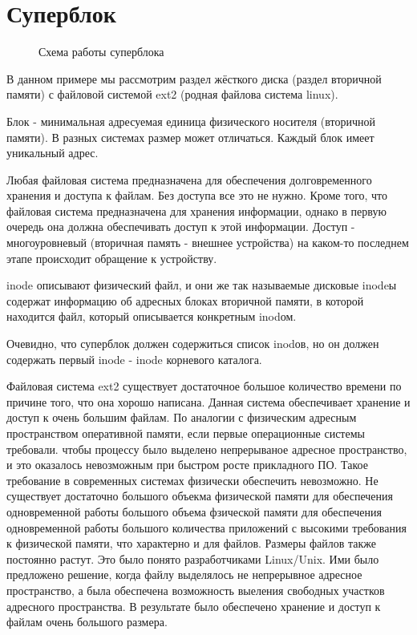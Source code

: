 \section{Суперблок}
\begin{figure}[H]
	\center{\texttt{[image: 1]}}
	\caption{Схема работы суперблока}
\end{figure}


В данном примере мы рассмотрим раздел жёсткого диска (раздел вторичной памяти) с файловой системой ext2 (родная файлова система linux).

Блок - минимальная адресуемая единица физического носителя (вторичной памяти). В разных системах размер может отличаться. Каждый блок имеет уникальный адрес.

Любая файловая система предназначена для обеспечения долговременного хранения и доступа к файлам. Без доступа все это не нужно. Кроме того, что файловая система предназначена для хранения информации, однако в первую очередь она должна обеспечивать доступ к этой информации. Доступ - многоуровневый (вторичная память - внешнее устройства) на каком-то последнем этапе происходит обращение к устройству.

inode описывают физический файл, и они же так называемые дисковые inodeы содержат информацию об адресных блоках вторичной памяти, в которой находится файл, который описывается конкретным inodом.

Очевидно, что суперблок должен содержиться список inodов, но он должен содержать первый inode - inode корневого каталога.

Файловая система ext2 существует достаточное большое количество времени по причине того, что она хорошо написана. Данная система обеспечивает хранение и доступ к очень большим файлам. По аналогии с физическим адресным пространством оперативной памяти, если первые операционные системы требовали. чтобы процессу было выделено непрерываное адресное пространство, и это оказалось невозможным при быстром росте прикладного ПО. Такое требование в современных системах физически обеспечить невозможно. Не существует достаточно большого объекма физической памяти для обеспечения одновременной работы большого объема фзической памяти для обеспечения одновременной работы большого количества приложений с высокими требования к физической памяти, что характерно и для файлов. Размеры файлов также постоянно растут. Это было понято разработчиками Linux/Unix. Ими было предложено решение, когда файлу выделялось не непрерывное адресное пространство, а была обеспечена возможность выеления свободных участков адресного пространства. В результате было обеспечено хранение и доступ к файлам очень большого размера.

